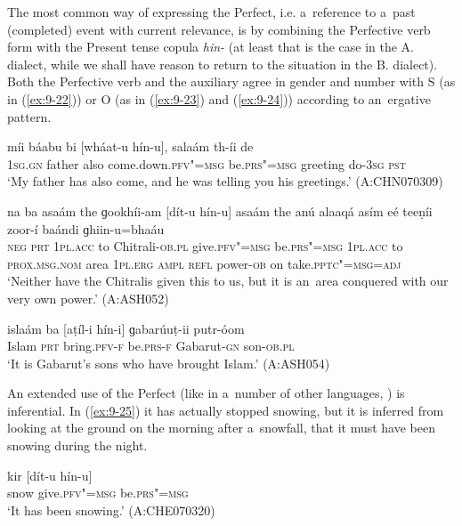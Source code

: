 The most common way of expressing the Perfect, i.e. a~reference to a~past (completed) event with current relevance, is by combining the Perfective verb form with the Present tense copula \textit{hin-} (at least that is the case in the A. dialect, while we shall have reason to return to the situation in the B. dialect). Both the Perfective verb and the auxiliary agree in gender and number with S (as in (\ref{ex:9-22})) or O (as in (\ref{ex:9-23}) and (\ref{ex:9-24})) according to an~ergative pattern.

\begin{exe}
\ex
\label{ex:9-22}
\gll míi báabu bi [wháat-u hín-u], salaám th-íi de \\
\textsc{1sg.gn} father also come.down.\textsc{pfv"=msg} be.\textsc{prs"=msg} greeting do-\textsc{3sg} \textsc{pst} \\
\glt `My father has also come, and he was telling you his greetings.' (A:CHN070309)

\ex
\label{ex:9-23}
\gll na ba asaám the ɡookhíi-am [dít-u hín-u] asaám the anú alaaqá asím eé teeṇíi zoor-í baándi ɡhiin-u=bhaáu \\
\textsc{neg} \textsc{prt} \textsc{1pl.acc} to Chitrali-\textsc{ob.pl} give.\textsc{pfv"=msg}  be.\textsc{prs"=msg } \textsc{1pl.acc} to \textsc{prox.msg.nom} area  \textsc{1pl.erg} \textsc{ampl} \textsc{refl} power-\textsc{ob} on take.\textsc{pptc"=msg=adj} \\
\glt `Neither have the Chitralis given this to us, but it is an~area conquered with our very own power.' (A:ASH052)

\ex
\label{ex:9-24}
\gll islaám ba [aṭíl-i hín-i] ɡabarúuṭ-ii putr-óom \\
Islam \textsc{prt} bring.\textsc{pfv-f} be.\textsc{prs-f} Gabarut-\textsc{gn} son-\textsc{ob.pl} \\
\glt `It is Gabarut's sons who have brought Islam.' (A:ASH054) 
\end{exe}

An extended use of the Perfect (like in a~number of other languages, \citealt[152]{dahl1985}) is inferential. In (\ref{ex:9-25}) it has actually stopped snowing, but it is inferred from looking at the ground on the morning after a~snowfall, that it must have been snowing during the night.

\begin{exe}
\ex
\label{ex:9-25}
\gll kir [dít-u hín-u] \\
snow give.\textsc{pfv"=msg} be.\textsc{prs"=msg} \\
\glt `It has been snowing.' (A:CHE070320)
\end{exe}

